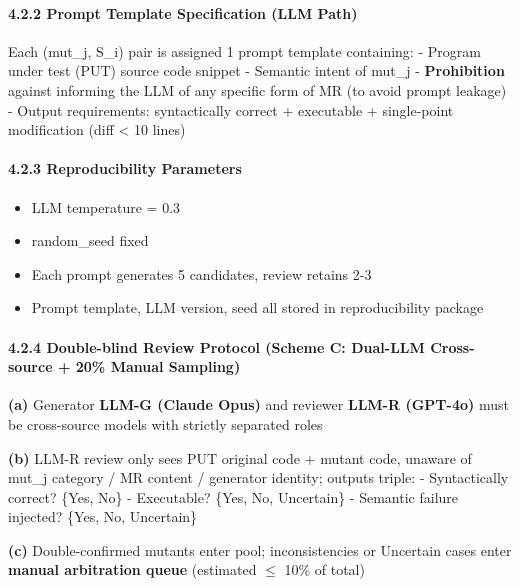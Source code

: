 \documentclass[review,12pt,authoryear]{elsarticle}
\providecommand{\tightlist}{\setlength{\itemsep}{0pt}\setlength{\parskip}{0pt}}
\begin{document}
\paragraph{4.2.2 Prompt Template Specification (LLM
Path)}\label{prompt-template-specification-llm-path}

Each (mut\_j, S\_i) pair is assigned 1 prompt template containing: -
Program under test (PUT) source code snippet - Semantic intent of mut\_j
- \textbf{Prohibition} against informing the LLM of any specific form of
MR (to avoid prompt leakage) - Output requirements: syntactically
correct + executable + single-point modification (diff \textless{} 10
lines)

\paragraph{4.2.3 Reproducibility
Parameters}\label{reproducibility-parameters}

\begin{itemize}
\tightlist
\item
  LLM temperature = 0.3
\item
  random\_seed fixed
\item
  Each prompt generates 5 candidates, review retains 2-3
\item
  Prompt template, LLM version, seed all stored in reproducibility
  package
\end{itemize}

\paragraph{4.2.4 Double-blind Review Protocol (Scheme C: Dual-LLM
Cross-source + 20\% Manual
Sampling)}\label{double-blind-review-protocol-scheme-c-dual-llm-cross-source-20-manual-sampling}

\textbf{(a)} Generator \textbf{LLM-G (Claude Opus)} and reviewer
\textbf{LLM-R (GPT-4o)} must be cross-source models with strictly
separated roles

\textbf{(b)} LLM-R review only sees PUT original code + mutant code,
unaware of mut\_j category / MR content / generator identity; outputs
triple: - Syntactically correct? \{Yes, No\} - Executable? \{Yes, No,
Uncertain\} - Semantic failure injected? \{Yes, No, Uncertain\}

\textbf{(c)} Double-confirmed mutants enter pool; inconsistencies or
Uncertain cases enter \textbf{manual arbitration queue} (estimated $\leq$
10\% of total)
\end{document}
